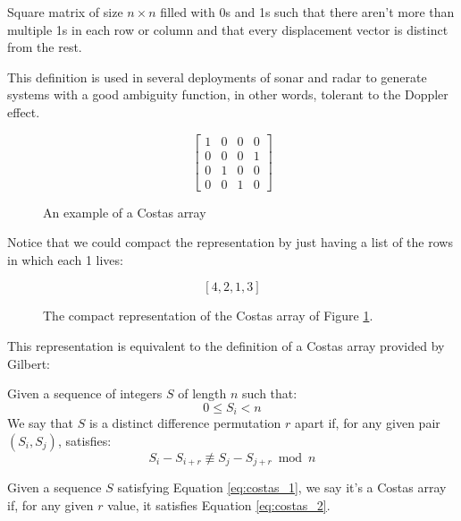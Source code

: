 \begin{definition}
  Square matrix of size $n×n$ filled with 0s and 1s such that there
  aren't more than multiple 1s in each row or column and that every
  displacement vector is distinct from the rest.
\end{definition}

This definition is used in several deployments of sonar and radar to generate
systems with a good ambiguity function, in other words, tolerant to the Doppler
effect.

\begin{figure}[ht!]
  $$
  \begin{bmatrix}
   1&0&0&0\\
   0&0&0&1\\
   0&1&0&0\\
   0&0&1&0
  \end{bmatrix}
  $$
  \caption{An example of a Costas array}
  \label{fig:costas_1}
\end{figure}

Notice that we could compact the representation by just having a list of the
rows in which each 1 lives:

\begin{figure}[ht!]
  $$[4, 2, 1, 3]$$
  \caption{The compact representation of the Costas array of Figure
  \ref{fig:costas_1}.}
  \label{fig:costas_2}
\end{figure}

This representation is equivalent to the definition of a Costas array provided
by Gilbert:

\begin{definition}\label{def:costas_1}
  Given a sequence of integers $S$ of length $n$ such that:
    \begin{equation}\label{eq:costas_1}
      0 \leq S_{i} < n
    \end{equation}
  We say that $S$ is a distinct difference permutation $r$ apart if,
  for any given pair $(S_{i}, S_{j})$, satisfies:
    \begin{equation}\label{eq:costas_2}
      S_{i} - S_{i+r} \not \equiv S_{j} - S_{j+r} \bmod n
    \end{equation}
\end{definition}

\begin{definition}
  Given a sequence $S$ satisfying Equation \ref{eq:costas_1}, we say it's a
  Costas array if, for any given $r$ value, it satisfies Equation
  \ref{eq:costas_2}.
\end{definition}

